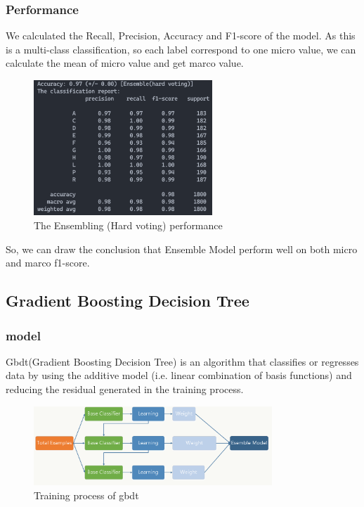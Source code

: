 \documentclass[11pt,en]{elegantpaper}
\begin{document}
\subsubsection*{Performance}
We calculated the Recall, Precision, Accuracy and F1-score of the model. As this is a multi-class classification, so each label correspond to one micro value, we can calculate the mean of micro value and get marco value.
\begin{figure}[H]
	\centering
	\includegraphics[width=0.6\textwidth]{image/hvpf}
	\caption{The Ensembling (Hard voting) performance}
	\label{hvpf}
\end{figure}
So, we can draw the conclusion that Ensemble Model perform well on both micro and marco f1-score.

\subsection{Gradient Boosting Decision Tree}

\subsubsection{model}
Gbdt(Gradient Boosting Decision Tree) is an algorithm that classifies or regresses data by using the additive model (i.e. linear combination of basis functions) and reducing the residual generated in the training process.

\begin{figure}[H]
	\centering
	\includegraphics[width=0.8\textwidth]{image/gbdt_1}
	\caption{Training process of gbdt}
	\label{gbdt1}
\end{figure}
\end{document}
